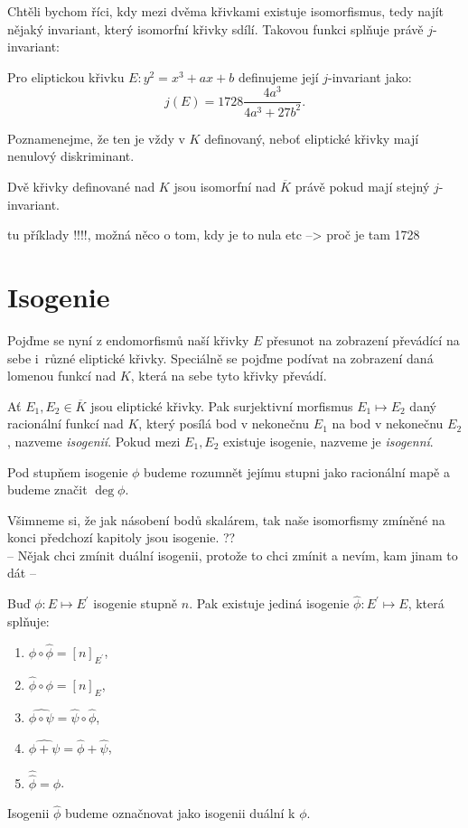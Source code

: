 \documentclass [12pt]{report}
\begin{document}
Chtěli bychom říci, kdy mezi dvěma křivkami existuje isomorfismus, tedy najít nějaký invariant, který isomorfní křivky sdílí. Takovou funkci splňuje právě $j$-invariant:
\begin{definice}
Pro eliptickou křivku $E: y^2 = x^3 + ax + b$ definujeme její $j$-invariant jako:
\begin{equation*}
j(E) = 1728 \frac{4a^3}{4a^3+27b^2}.
\end{equation*}
\end{definice}
Poznamenejme, že ten je vždy v $K$ definovaný, neboť eliptické křivky mají nenulový diskriminant.
\begin{veta}
Dvě křivky definované nad $K$ jsou isomorfní nad $\overline{K}$ právě pokud mají stejný $j$-invariant.
\end{veta}
tu příklady !!!!, možná něco o tom, kdy je to nula etc --> proč je tam 1728


\section{Isogenie}

Pojďme se nyní z endomorfismů naší křivky $E$ přesunot na zobrazení převádící na sebe i~různé eliptické křivky. Speciálně se pojďme podívat na zobrazení daná lomenou funkcí nad $K$, která na sebe tyto křivky převádí.

\begin{definice}
Ať $E_1,E_2 \in \overline{K}$ jsou eliptické křivky. Pak surjektivní morfismus $E_1 \mapsto E_2$  daný racionální funkcí nad $K$,  který posílá bod v nekonečnu $E_1$ na bod v nekonečnu $E_2$, nazveme \textit{isogenií}. Pokud mezi $E_1,E_2$ existuje isogenie, nazveme je \textit{isogenní}.
\end{definice}
\begin{definice}
Pod stupňem isogenie $\phi$ budeme rozumnět jejímu stupni jako racionální mapě a budeme značit $\deg \phi$.
\end{definice}

Všimneme si, že jak násobení bodů skalárem, tak naše isomorfismy zmíněné na konci předchozí kapitoly jsou isogenie. ?? \\

-- Nějak chci zmínit duální isogenii, protože to chci zmínit a nevím, kam jinam to dát --\\

\begin{veta}
Buď $\phi: E \mapsto E^\prime$ isogenie stupně $n$. Pak existuje jediná isogenie $\hat{\phi}: E^\prime \mapsto E$, která splňuje:
\begin{enumerate}
\item $\phi \circ \hat{\phi} = [n]_{E^\prime}$,
\item $\hat{\phi} \circ \phi = [n]_E$,
\item $\widehat{\phi \circ \psi} = \hat{\psi} \circ \hat{\phi}$,
\item $\widehat{\phi + \psi} = \hat{\phi} + \hat{\psi}$,
\item $\hat{\hat{\phi} } = \phi $.
\end{enumerate} 
Isogenii $\hat{\phi}$ budeme označnovat jako isogenii duální k $\phi$.
\end{veta}
\end{document}
